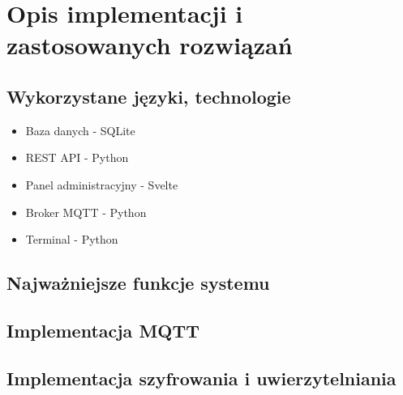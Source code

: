 \section{Opis implementacji i zastosowanych rozwiązań}
\subsection{Wykorzystane języki, technologie}
\begin{itemize}
  \item{Baza danych - SQLite}
  \item{REST API - Python}
  \item{Panel administracyjny - Svelte}
  \item{Broker MQTT - Python}
  \item{Terminal - Python}
\end{itemize}
\subsection{Najważniejsze funkcje systemu}
\subsection{Implementacja MQTT}
\subsection{Implementacja szyfrowania i uwierzytelniania}
